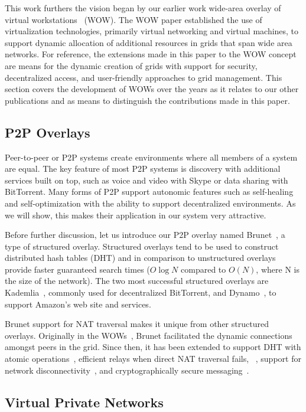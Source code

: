 \documentclass[conference]{IEEEtran}
\begin{document}
This work furthers the vision began by our earlier work wide-area overlay of
virtual workstations~\cite{wow} (WOW).  The WOW paper established the use of
virtualization technologies, primarily virtual networking and virtual machines,
to support dynamic allocation of additional resources in grids that span wide
area networks.  For reference, the extensions made in this paper to the WOW
concept are means for the dynamic creation of grids with support for security,
decentralized access, and user-friendly approaches to grid management.  This
section covers the development of WOWs over the years as it relates to our
other publications and as means to distinguish the contributions made in this
paper.

\subsection{P2P Overlays}

Peer-to-peer or P2P systems create environments where all members of a system
are equal.  The key feature of most P2P systems is discovery with additional
services built on top, such as voice and video with Skype or data sharing with
BitTorrent.  Many forms of P2P support autonomic features such as self-healing
and self-optimization with the ability to support decentralized environments.
As we will show, this makes their application in our system very attractive.

Before further discussion, let us introduce our P2P overlay named
Brunet~\cite{brunet}, a type of structured overlay.  Structured overlays tend
to be used to construct distributed hash tables (DHT) and in comparison to
unstructured overlays provide faster guaranteed search times ($O\log N$
compared to $O(N)$, where N is the size of the network).  The two most
successful structured overlays are Kademlia~\cite{kademlia}, commonly used for
decentralized BitTorrent, and Dynamo~\cite{dynamo}, to support Amazon's web
site and services.

Brunet support for NAT traversal makes it unique from other structured
overlays.  Originally in the WOWs~\cite{wow}, Brunet facilitated the dynamic
connections amongst peers in the grid.  Since then, it has been extended to
support DHT with atomic operations~\cite{pcgrid}, efficient relays when direct
NAT traversal fails, ~\cite{groupvpn}, support for network
disconnectivity~\cite{hpdc08}, and cryptographically secure
messaging~\cite{groupvpn}.

\subsection{Virtual Private Networks}
\end{document}
